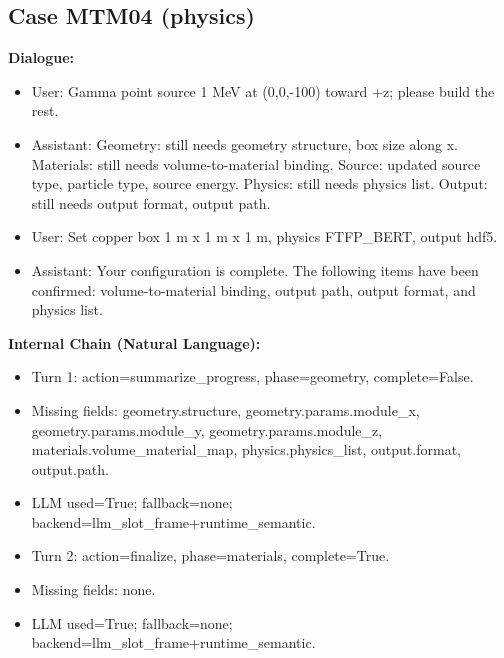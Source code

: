 \documentclass[11pt]{ctexart}
\begin{document}
\subsection{Case MTM04 (physics)}
\textbf{Dialogue:}
\begin{itemize}
\item User: Gamma point source 1 MeV at (0,0,-100) toward +z; please build the rest.
\item Assistant: Geometry: still needs geometry structure, box size along x. Materials: still needs volume-to-material binding. Source: updated source type, particle type, source energy. Physics: still needs physics list. Output: still needs output format, output path.
\item User: Set copper box 1 m x 1 m x 1 m, physics FTFP\_BERT, output hdf5.
\item Assistant: Your configuration is complete. The following items have been confirmed: volume-to-material binding, output path, output format, and physics list.
\end{itemize}
\textbf{Internal Chain (Natural Language):}
\begin{itemize}
\item Turn 1: action=summarize\_progress, phase=geometry, complete=False.
\item Missing fields: geometry.structure, geometry.params.module\_x, geometry.params.module\_y, geometry.params.module\_z, materials.volume\_material\_map, physics.physics\_list, output.format, output.path.
\item LLM used=True; fallback=none; backend=llm\_slot\_frame+runtime\_semantic.
\item Turn 2: action=finalize, phase=materials, complete=True.
\item Missing fields: none.
\item LLM used=True; fallback=none; backend=llm\_slot\_frame+runtime\_semantic.
\end{itemize}
\end{document}
